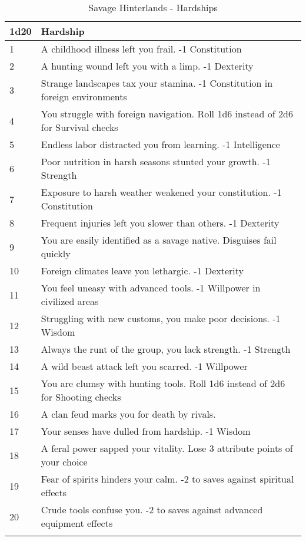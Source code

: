 \documentclass[itdr/core]{subfiles}
\begin{document}
\begin{longtable}{p{}p{}}
\hline
\textbf{1d20} & \textbf{Hardship} \\
\hline
1 & A childhood illness left you frail. -1 Constitution \\
2 & A hunting wound left you with a limp. -1 Dexterity \\
3 & Strange landscapes tax your stamina. -1 Constitution in foreign environments \\
4 & You struggle with foreign navigation. Roll 1d6 instead of 2d6 for Survival checks \\
5 & Endless labor distracted you from learning. -1 Intelligence \\
6 & Poor nutrition in harsh seasons stunted your growth. -1 Strength \\
7 & Exposure to harsh weather weakened your constitution. -1 Constitution \\
8 & Frequent injuries left you slower than others. -1 Dexterity \\
9 & You are easily identified as a savage native. Disguises fail quickly \\
10 & Foreign climates leave you lethargic. -1 Dexterity \\
11 & You feel uneasy with advanced tools. -1 Willpower in civilized areas \\
12 & Struggling with new customs, you make poor decisions. -1 Wisdom \\
13 & Always the runt of the group, you lack strength. -1 Strength \\
14 & A wild beast attack left you scarred. -1 Willpower \\
15 & You are clumsy with hunting tools. Roll 1d6 instead of 2d6 for Shooting checks \\
16 & A clan feud marks you for death by rivals. \\
17 & Your senses have dulled from hardship. -1 Wisdom \\
18 & A feral power sapped your vitality. Lose 3 attribute points of your choice \\
19 & Fear of spirits hinders your calm. -2 to saves against spiritual effects \\
20 & Crude tools confuse you. -2 to saves against advanced equipment effects \\
\hline
\caption{Savage Hinterlands - Hardships}
\label{table:savage-hardships}
\end{longtable}
\end{document}
